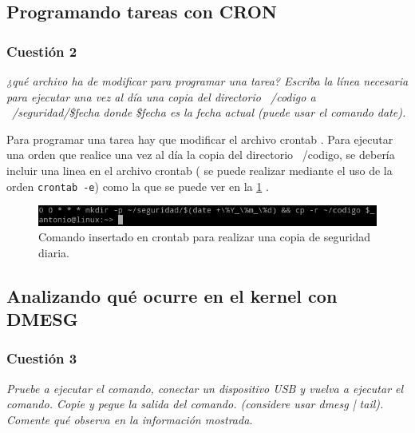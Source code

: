 \subsection{Programando tareas con CRON}
\subsubsection{Cuestión 2}
\textit{¿qué archivo ha de modificar para programar una tarea? Escriba la línea necesaria para ejecutar una vez al día una copia del directorio ~/codigo a ~/seguridad/\$fecha donde \$fecha es la fecha actual (puede usar el comando date).}
\newline

Para programar una tarea hay que modificar el archivo crontab \cite{cron} \cite{cron2}. Para ejecutar una orden que realice una vez al día la copia del directorio ~/codigo, se debería incluir una linea en el archivo crontab ( se puede realizar mediante el uso de la orden \texttt{crontab -e}) como la que se puede ver en la  \cref{fig1} \cite{date}.

\begin{figure}[H]
  \begin{center}
    \includegraphics[width=1\textwidth]{imagenes/cron}
    \caption{Comando insertado en crontab para realizar una copia de seguridad diaria.}
    \label{fig1}
  \end{center}
\end{figure}

\subsection{Analizando qué ocurre en el kernel con DMESG}


\subsubsection{Cuestión 3}
\textit{Pruebe a ejecutar el comando, conectar un dispositivo USB y vuelva a ejecutar el comando. Copie y pegue la salida del comando. (considere usar dmesg | tail). Comente qué observa en la información mostrada.}
\newline

